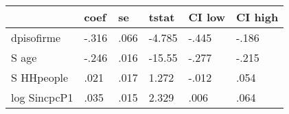 \begin{table}[htbp]
\begin{tabular}{llllll} \hline \hline
 & coef  & se  & tstat  & CI low  & CI high  \\  \hline 
dpisofirme & -.316 & .066 & -4.785 & -.445 & -.186 \\  
S age & -.246 & .016 & -15.55 & -.277 & -.215 \\  
S HHpeople & .021 & .017 & 1.272 & -.012 & .054 \\  
log SincpcP1 & .035 & .015 & 2.329 & .006 & .064 \\  
\hline \hline \end{tabular}
\end{table}
